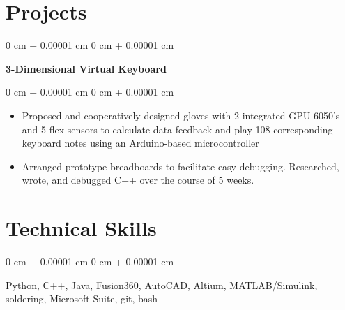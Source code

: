 \documentclass[10pt, letterpaper]{article}
\newenvironment{highlights}{
    \begin{itemize}[
        topsep=0.10 cm,
        parsep=0.10 cm,
        partopsep=0pt,
        itemsep=0pt,
        leftmargin=0 cm + 10pt
    ]
}{
    \end{itemize}
} %
\newenvironment{onecolentry}{
    \begin{adjustwidth}{
        0 cm + 0.00001 cm
    }{
        0 cm + 0.00001 cm
    }
}{
    \end{adjustwidth}
} %
\newenvironment{twocolentry}[2][]{
    \onecolentry
    \def\secondColumn{#2}
    \setcolumnwidth{\fill, 4.5 cm}
    \begin{paracol}{2}
}{
    \switchcolumn \raggedleft \secondColumn
    \end{paracol}
    \endonecolentry
} %
\begin{document}
    
    \section{Projects}



        
        \begin{twocolentry}{
    
        }
            \textbf{3-Dimensional Virtual Keyboard}\end{twocolentry}

        \vspace{0.10 cm}
        \begin{onecolentry}
            \begin{highlights}
                \item Proposed and cooperatively designed gloves with 2 integrated GPU-6050's and 5 flex sensors to calculate data feedback and play
                108 corresponding keyboard notes using an Arduino-based microcontroller
                \item Arranged prototype breadboards to facilitate easy debugging. Researched, wrote, and debugged C++ over the
                course of 5 weeks.
            \end{highlights}
        \end{onecolentry}
    
    \section{Technical Skills}

        \begin{onecolentry}
            \item Python, C++, Java, Fusion360, AutoCAD, Altium, MATLAB/Simulink, soldering, Microsoft Suite, git, bash
        \end{onecolentry}
\end{document}
